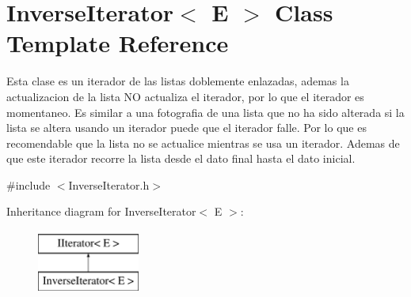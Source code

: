 \hypertarget{class_inverse_iterator}{\section{Inverse\-Iterator$<$ E $>$ Class Template Reference}
\label{class_inverse_iterator}
}


Esta clase es un iterador de las listas doblemente enlazadas, ademas la actualizacion de la lista N\-O actualiza el iterador, por lo que el iterador es momentaneo. Es similar a una fotografia de una lista que no ha sido alterada si la lista se altera usando un iterador puede que el iterador falle. Por lo que es recomendable que la lista no se actualice mientras se usa un iterador. Ademas de que este iterador recorre la lista desde el dato final hasta el dato inicial.  




{\ttfamily \#include $<$Inverse\-Iterator.\-h$>$}

Inheritance diagram for Inverse\-Iterator$<$ E $>$\-:\begin{figure}[H]
\begin{center}
\leavevmode
\includegraphics[height=2.000000cm]{class_inverse_iterator}
\end{center}
\end{figure}
